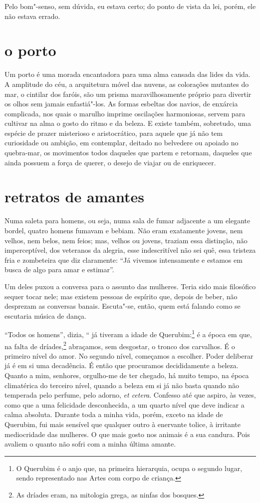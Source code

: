 Pelo bom"-senso, sem dúvida, eu estava certo; do ponto de vista
da lei, porém, ele não estava errado.

\quebra\section[O porto]{o porto}

Um porto é uma morada encantadora para uma alma cansada das lides da
vida. A amplitude do céu, a arquitetura móvel das nuvens, as colorações
mutantes do mar, o cintilar dos faróis, são um prisma maravilhosamente
próprio para divertir os olhos sem jamais enfastiá"-los. As formas
esbeltas dos navios, de enxárcia complicada, nos quais o marulho
imprime oscilações harmoniosas, servem para cultivar na alma o gosto
do ritmo e da beleza. E existe também, sobretudo, uma espécie de prazer
misterioso e aristocrático, para aquele que já não tem curiosidade
ou ambição, em contemplar, deitado no belvedere ou apoiado no
quebra-mar, os movimentos todos daqueles que partem e 
retornam, daqueles que ainda possuem a força de querer, o desejo de
viajar ou de enriquecer.

\quebra\section[Retratos de amantes]{retratos de amantes}

Numa saleta para homens, ou seja, numa sala de fumar adjacente a um
elegante bordel, quatro homens fumavam e bebiam. Não eram
exatamente jovens, nem velhos, nem belos, nem feios; mas, velhos ou
jovens, traziam essa distinção, não imperceptível, dos veteranos da
alegria, esse indescritível não sei quê, essa tristeza fria e zombeteira
que diz claramente: “Já vivemos intensamente e
estamos em busca de algo para amar e estimar''.

Um deles puxou a conversa para o assunto das mulheres. Teria sido mais
filosófico sequer tocar nele; mas existem pessoas de espírito que,
depois de beber, não desprezam as conversas banais. Escuta"-se, então,
quem está falando como se escutaria música de dança.

“Todos os homens'', dizia, “ já tiveram a idade de
Querubim:\protect\footnote{ O Querubim é o anjo que, na primeira hierarquia, ocupa o segundo
lugar, sendo representado nas Artes com corpo de criança.}
 é a época em que, na falta de
dríades,\protect\footnote{ As dríades eram, na mitologia grega, 
as ninfas dos bosques.} abraçamos, sem desgostar, o tronco dos
carvalhos. É o primeiro nível do amor. No segundo nível, começamos a
escolher. Poder deliberar já é em si uma decadência. É então que procuramos
decididamente a beleza. Quanto a mim, senhores, orgulho-me de ter
chegado, há muito tempo, na época climatérica do terceiro nível, quando
a beleza em si já não basta quando não temperada pelo perfume, pelo
adorno, \textit{et cetera}. Confesso até que aspiro, às vezes, como que a uma
felicidade desconhecida, a um quarto nível que deve indicar a calma
absoluta. Durante toda a minha vida, porém, exceto na idade de Querubim,
fui mais sensível que qualquer outro à enervante tolice, à irritante
mediocridade das mulheres. O que mais gosto nos animais é a sua
candura. Pois avaliem o quanto não sofri com a minha última
amante.

